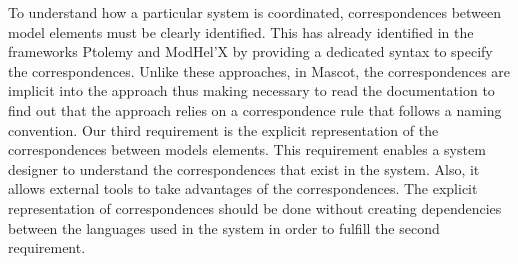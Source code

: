 




To understand how a particular system is coordinated, correspondences between model elements must be clearly identified. This has already identified in the frameworks Ptolemy and ModHel'X by providing a dedicated syntax to specify the correspondences. Unlike these approaches, in Mascot, the correspondences are implicit into the approach thus making necessary to read the documentation to find out that the approach relies on a correspondence rule that follows a naming convention. Our third requirement is the explicit representation of the correspondences between models elements. This requirement enables a system designer to understand the correspondences that exist in the system. Also, it allows external tools to take advantages of the correspondences. The explicit representation of correspondences should be done without creating dependencies between the languages used in the system in order to fulfill the second requirement. 
	
	
